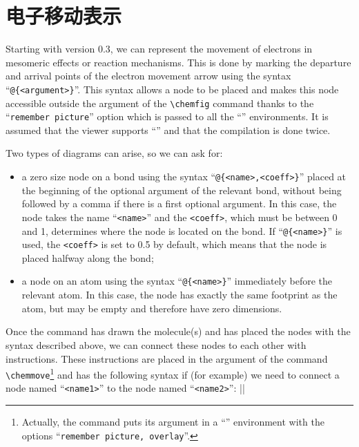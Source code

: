 \documentclass[10pt]{article}
\begin{document}
\section{电子移动表示}\label{mecanismes-reactionnels}
Starting with \CF version 0.3, we can represent the movement of electrons in mesomeric effects or reaction mechanisms. This is done by marking the departure and arrival points of the electron movement arrow using the syntax ``\verb-@{<argument>}-''. This syntax allows a \TIKZ node to be placed and makes this node accessible outside the argument of the \verb-\chemfig- command thanks to the ``\texttt{remember picture}'' option which is passed to all the ``'' environments. It is assumed that the viewer supports ``'' and that the compilation is done twice.

Two types of diagrams can arise, so we can ask for:
\begin{itemize}
	\item a zero size node on a bond using the syntax ``\verb-@{<name>,<coeff>}-'' placed at the beginning of the optional argument of the relevant bond, without being followed by a comma if there is a first optional argument. In this case, the node takes the name ``\verb-<name>-'' and the \verb-<coeff>-, which must be between 0 and 1, determines where the node is located on the bond. If ``\verb-@{<name>}-'' is used, the \verb-<coeff>- is set to 0.5 by default, which means that the node is placed halfway along the bond;
	\item a node on an atom using the syntax ``\verb-@{<name>}-'' immediately before the relevant atom. In this case, the node has exactly the same footprint as the atom, but may be empty and therefore have zero dimensions.
\end{itemize}
Once the \idx{\chemfig} command has drawn the molecule(s) and has placed the nodes with the syntax described above, we can connect these nodes to each other with \TIKZ instructions. These instructions are placed in the argument of the command \verb-\chemmove-\footnote{Actually, the \texttt{\string\chemmove} command puts its argument in a ``'' environment with the options ``\texttt{remember picture, overlay}''.} and has the following syntax if (for example) we need to connect a node named ``\verb-<name1>-'' to the node named ``\verb-<name2>-'':
\centerverb||
\smallskip
\end{document}
